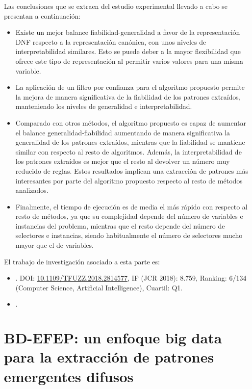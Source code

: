 \documentclass[c5paper,10pt,twoside]{book}	   	%
\newcommand{\doi}[1]{\href{https://doi.org/#1}{#1}}
\begin{document}
Las conclusiones que se extraen del estudio experimental llevado a cabo se presentan a continuación:

\begin{itemize}
	\item Existe un mejor balance fiabilidad-generalidad a favor de la representación \ac{DNF} respecto a la representación canónica, con unos niveles de interpretabilidad similares. Esto se puede deber a la mayor flexibilidad que ofrece este tipo de representación al permitir varios valores para una misma variable.
	
	\item La aplicación de un filtro por confianza para el algoritmo propuesto permite la mejora de manera significativa de la fiabilidad de los patrones extraídos, manteniendo los niveles de generalidad e interpretabilidad.
	
	\item Comparado con otros métodos, el algoritmo propuesto es capaz de aumentar el balance generalidad-fiabilidad aumentando de manera significativa la generalidad de los patrones extraídos, mientras que la fiabilidad se mantiene similar con respecto al resto de algoritmos. Además, la interpretabilidad de los patrones extraídos es mejor que el resto al devolver un número muy reducido de reglas. Estos resultados implican una extracción de patrones más interesantes por parte del algoritmo propuesto respecto al resto de métodos analizados.
	
	\item Finalmente, el tiempo de ejecución es de media el más rápido con respecto al resto de métodos, ya que su complejidad depende del número de variables e instancias del problema, mientras que el resto depende del número de selectores e instancias, siendo habitualmente el número de selectores mucho mayor que el de variables.
\end{itemize}

El trabajo de investigación asociado a esta parte es:

\begin{itemize}
	\item \sloppy {}. DOI: \doi{10.1109/TFUZZ.2018.2814577}, IF (JCR 2018): 8.759, Ranking: 6/134 (Computer Science, Artificial Intelligence), Cuartil: Q1.
	
	\item {}.
\end{itemize}



\section{BD-EFEP: un enfoque big data para la extracción de patrones emergentes difusos} \label{sec:bd-efep}
\end{document}
